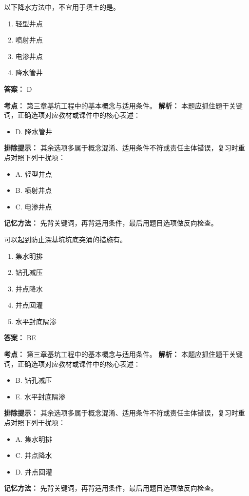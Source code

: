 \documentclass[UTF8,fontset=fandol,11pt]{ctexart}
\begin{document}
\begin{quizbox}[title={第 13 题}]
以下降水方法中，不宜用于填土的是。\\
\begin{enumerate}[label=\Alph*.]
\item 轻型井点
\item 喷射井点
\item 电渗井点
\item 降水管井
\end{enumerate}
\textbf{答案：} D
\vspace{0.25em}
\begin{answerbox}[title={考点解析}]
\textbf{考点：} 第三章基坑工程中的基本概念与适用条件。
\textbf{解析：} 本题应抓住题干关键词，正确选项对应教材或课件中的核心表述：
\begin{itemize}
\item D. 降水管井
\end{itemize}
\textbf{排除提示：} 其余选项多属于概念混淆、适用条件不符或责任主体错误，复习时重点对照下列干扰项：
\begin{itemize}
\item A. 轻型井点
\item B. 喷射井点
\item C. 电渗井点
\end{itemize}
\textbf{记忆方法：} 先背关键词，再背适用条件，最后用题目选项做反向检查。
\end{answerbox}
\end{quizbox}

\begin{quizbox}[title={第 14 题}]
可以起到防止深基坑坑底突涌的措施有。\\
\begin{enumerate}[label=\Alph*.]
\item 集水明排
\item 钻孔减压
\item 井点降水
\item 井点回灌
\item 水平封底隔渗
\end{enumerate}
\textbf{答案：} BE
\vspace{0.25em}
\begin{answerbox}[title={考点解析}]
\textbf{考点：} 第三章基坑工程中的基本概念与适用条件。
\textbf{解析：} 本题应抓住题干关键词，正确选项对应教材或课件中的核心表述：
\begin{itemize}
\item B. 钻孔减压
\item E. 水平封底隔渗
\end{itemize}
\textbf{排除提示：} 其余选项多属于概念混淆、适用条件不符或责任主体错误，复习时重点对照下列干扰项：
\begin{itemize}
\item A. 集水明排
\item C. 井点降水
\item D. 井点回灌
\end{itemize}
\textbf{记忆方法：} 先背关键词，再背适用条件，最后用题目选项做反向检查。
\end{answerbox}
\end{quizbox}
\end{document}
